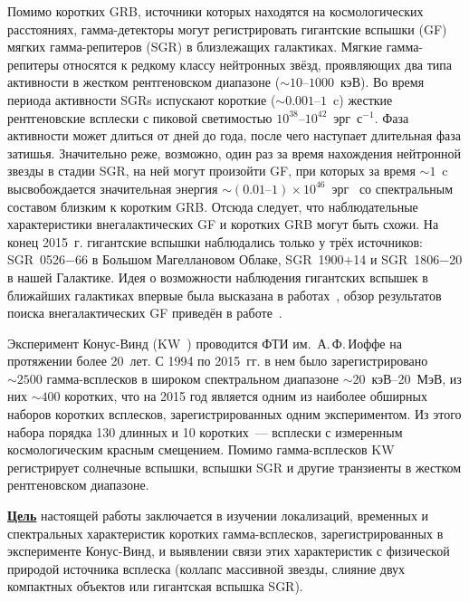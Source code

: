 Помимо коротких GRB, источники которых находятся на космологических расстояниях,
гамма-детекторы могут регистрировать гигантские вспышки (GF) мягких гамма-репитеров (SGR)
в близлежащих галактиках. Мягкие гамма-репитеры относятся 
к редкому классу нейтронных звёзд, проявляющих 
два типа активности в жестком рентгеновском диапазоне ($\sim 10\textrm{--}1000$~кэВ). 
Во время периода активности SGRs испускают короткие ($\sim0.001\textrm{--}1$~c) жесткие рентгеновские всплески 
с пиковой светимостью $10^{38}\textrm{--}10^{42}$~эрг~с$^{-1}$. Фаза активности может длиться 
от дней до года, после чего наступает длительная фаза затишья. Значительно реже, 
возможно, один раз за время нахождения нейтронной звезды в стадии SGR, на ней могут произойти GF, 
при которых за время $\sim 1$~c высвобождается значительная 
энергия $\sim(0.01\textrm{--}1)\times 10^{46}$~эрг~\citep{Mereghetti2013} 
со спектральным составом близким к коротким GRB.
Отсюда следует, что наблюдательные характеристики внегалактических GF и коротких GRB могут быть схожи. 
На конец 2015~г. гигантские вспышки наблюдались только у трёх источников: 
SGR~0526$-$66 в Большом Магеллановом Облаке, SGR~1900$+$14 и SGR~1806$-$20 в нашей Галактике.
Идея о возможности наблюдения гигантских вспышек в ближайших галактиках впервые была высказана 
в работах~\citep{Mazets1981}, обзор результатов поиска 
внегалактических GF приведён в работе~\citep{Hurley2011}.

Эксперимент Конус-Винд (KW~\citep{Aptekar_1995SSR}) проводится ФТИ им.~А.\,Ф.\,Иоффе 
на протяжении более 20~лет. С 1994 по 2015~гг. в нем  было зарегистрировано 
$\sim 2500$ гамма-всплесков в широком спектральном диапазоне $\sim 20$~кэВ--20~МэВ,
из них $\sim 400$ коротких, что на 2015 год является 
одним из наиболее обширных наборов коротких всплесков, зарегистрированных 
одним экспериментом. Из этого набора порядка 130 длинных и 10 коротких~--- всплески 
с измеренным космологическим красным смещением. 
Помимо гамма-всплесков KW регистрирует солнечные вспышки, вспышки SGR 
и другие транзиенты в жестком рентгеновском диапазоне.

\underline{\textbf{Цель}} настоящей работы заключается в изучении локализаций, 
временных и спектральных характеристик коротких гамма-всплесков, 
зарегистрированных в эксперименте Конус-Винд, и выявлении 
связи этих характеристик с физической природой источника всплеска 
(коллапс массивной звезды, слияние двух компактных объектов или гигантская вспышка SGR).

